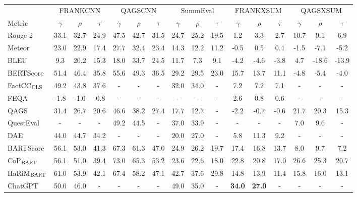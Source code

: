 \begin{table}[h]
	\scriptsize
	\centering
	\begin{tabular}{l|ccc|ccc|ccc|ccc|ccc}
		\toprule[1pt]
		  & \multicolumn{3}{c}{FRANKCNN} & \multicolumn{3}{c}{QAGSCNN} &  \multicolumn{3}{c}{SummEval}  & \multicolumn{3}{c}{FRANKXSUM}  & \multicolumn{3}{c}{QAGSXSUM} \\
		 Metric & $\gamma$ &$\rho$ & $\tau$ & $\gamma$ &$\rho$ & $\tau$ & $\gamma$ &$\rho$ & $\tau$ & $\gamma$ &$\rho$ & $\tau$ & $\gamma$ &$\rho$ & $\tau$ \\
		\hline
		Rouge-2&  33.1 & 32.7 & 24.9 & 47.5 & 42.7 & 31.5 & 24.7 & 25.2 & 19.5 & 1.2 & 3.3 & 2.7 & 10.7 & 9.1 & 6.9 \\
		Meteor& 23.0 & 22.9 & 17.4 & 27.7 & 32.4 & 23.4 & 14.3 & 12.2 & 11.2 & -0.5 & 0.5 & 0.4 & -1.5 & -7.1 & -5.2 \\
		BLEU & 9.3 & 20.2 & 15.3 & 18.0 & 33.7 & 24.5 & 11.7 & 7.3 & 9.1 & -4.2 & -4.6 & -3.8 & 4.7 & -18.6 & -13.9 \\
		BERTScore &  51.4 &46.4& 35.8 & 55.6& 49.3& 36.5 & 29.2& 29.5& 23.0 &15.7 & 13.7 & 11.1 & -4.8 &-5.4 & -4.0\\
		FactCC$_{\rm CLS}$ & 49.2 & 43.8 & 37.6 & -&- &- & 32.0 & 34.0 & - & 7.2 & 7.2 & 7.1 & -&- &- \\
		FEQA & -1.8 & -1.0 & -0.8 &- &- &- &- &- &- & 2.6 & 0.8 & 0.6 & -&- &- \\
		QAGS & 31.4 & 26.7 & 20.6 & 46.6 & 38.2 & 27.4 & 17.7 & 12.7 & - & -2.2 & -0.7 & -0.6 & 21.7 & 20.3 & 15.3 \\
		QuestEval &- &- &- & 49.2 & 44.5 & - & 37.0 & 33.9 & - &- & -& -& 7.0 & 9.6 & - \\
		DAE & 44.0 & 44.7 & 34.2 & -& -&- & 20.0 & 27.0 & - & 5.8 & 11.3 & 9.2 & -& -& -\\
		BARTScore & 56.1 & 53.0 & 41.3 & 67.3 & 61.3 & 47.0 & 24.9 & 26.2 & 19.7 & 17.4 & 16.8 & 13.7 & 8.0 & 9.7 & 7.2 \\
		CoP$_{\rm BART}$ & 56.1 & 51.0 & 39.4 & 73.0 & 65.3 & 53.2 & 23.6 & 22.6 & 18.0 & 22.8 & 20.8 & 17.0 & 26.6 & 25.3 & 20.7 \\
		HaRiM$_{\rm BART}$  & 61.0 & 53.9 & 42.1 & 67.4 & 58.2 & 47.1 & 42.7 & 37.6 & 29.8 & 14.8 & 13.9 & 11.4 & 15.8 & 16.0 & 13.1 \\ 
		ChatGPT & 50.0 & 46.0 & - & - & - & - & 49.0 & 35.0 & - & \textbf{34.0} & \textbf{27.0} & - & - & - & - \\ %

\end{tabular}
\end{table}
